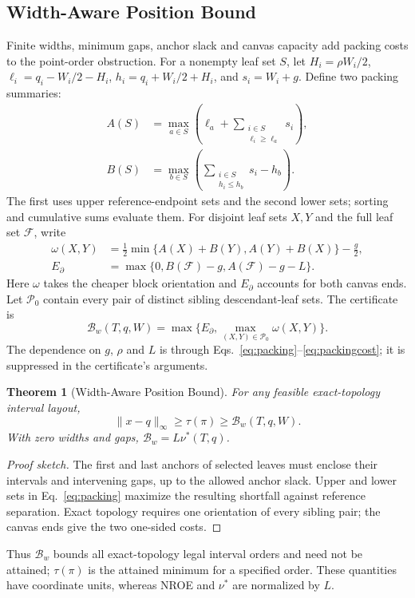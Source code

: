 \documentclass[review]{vgtc}
\newtheorem{theorem}{Theorem}
\begin{document}
\subsection{Width-Aware Position Bound}
Finite widths, minimum gaps, anchor slack and canvas capacity add packing costs to the point-order obstruction. For a nonempty leaf set $S$, let $H_i=\rho W_i/2$, $\ell_i=q_i-W_i/2-H_i$, $h_i=q_i+W_i/2+H_i$, and $s_i=W_i+g$. Define two packing summaries:
\begin{equation}\label{eq:packing}
\begin{aligned}
 A(S)&=\max_{a\in S}\left(\ell_a+\sum_{\substack{i\in S\\\ell_i\ge\ell_a}}s_i\right),\\
 B(S)&=\max_{b\in S}\left(\sum_{\substack{i\in S\\h_i\le h_b}}s_i-h_b\right).
\end{aligned}
\end{equation}
The first uses upper reference-endpoint sets and the second lower sets; sorting and cumulative sums evaluate them. For disjoint leaf sets $X,Y$ and the full leaf set $\mathcal{F}$, write
\begin{equation}\label{eq:packingcost}
\begin{aligned}
 \omega(X,Y)&=\tfrac12\min\{A(X)+B(Y),A(Y)+B(X)\}-\tfrac g2,\\
 E_\partial&=\max\{0,B(\mathcal{F})-g,A(\mathcal{F})-g-L\}.
\end{aligned}
\end{equation}
Here $\omega$ takes the cheaper block orientation and $E_\partial$ accounts for both canvas ends. Let $\mathcal{P}_0$ contain every pair of distinct sibling descendant-leaf sets. The certificate is
\begin{equation}\label{eq:bwdef}
 \mathcal{B}_w(T,q,W)=\max\{E_\partial,\max_{(X,Y)\in\mathcal{P}_0}\omega(X,Y)\}.
\end{equation}
The dependence on $g$, $\rho$ and $L$ is through Eqs.~\ref{eq:packing}--\ref{eq:packingcost}; it is suppressed in the certificate's arguments.
\begin{theorem}[Width-Aware Position Bound]\label{thm:width}
For any feasible exact-topology interval layout,
\begin{equation}\label{eq:widthbound}
 \|x-q\|_\infty\ge\tau(\pi)\ge\mathcal{B}_w(T,q,W).
\end{equation}
With zero widths and gaps, $\mathcal{B}_w=L\nu^*(T,q)$.
\end{theorem}
\begin{proof}[Proof sketch]
The first and last anchors of selected leaves must enclose their intervals and intervening gaps, up to the allowed anchor slack. Upper and lower sets in Eq.~\ref{eq:packing} maximize the resulting shortfall against reference separation. Exact topology requires one orientation of every sibling pair; the canvas ends give the two one-sided costs.
\end{proof}
Thus $\mathcal{B}_w$ bounds all exact-topology legal interval orders and need not be attained; $\tau(\pi)$ is the attained minimum for a specified order. These quantities have coordinate units, whereas NROE and $\nu^*$ are normalized by $L$.
\end{document}
